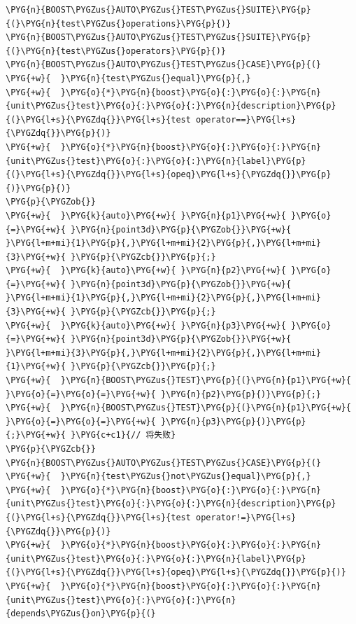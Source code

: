 \begin{itemize}
\begin{codeblockbg}
\begin{Verbatim}[commandchars=\\\{\},breaklines=true,breakanywhere=true,fontsize=\codefont,xleftmargin=17bp]
\PYG{n}{BOOST\PYGZus{}AUTO\PYGZus{}TEST\PYGZus{}SUITE}\PYG{p}{(}\PYG{n}{test\PYGZus{}operations}\PYG{p}{)}
\PYG{n}{BOOST\PYGZus{}AUTO\PYGZus{}TEST\PYGZus{}SUITE}\PYG{p}{(}\PYG{n}{test\PYGZus{}operators}\PYG{p}{)}
\PYG{n}{BOOST\PYGZus{}AUTO\PYGZus{}TEST\PYGZus{}CASE}\PYG{p}{(}
\PYG{+w}{  }\PYG{n}{test\PYGZus{}equal}\PYG{p}{,}
\PYG{+w}{  }\PYG{o}{*}\PYG{n}{boost}\PYG{o}{:}\PYG{o}{:}\PYG{n}{unit\PYGZus{}test}\PYG{o}{:}\PYG{o}{:}\PYG{n}{description}\PYG{p}{(}\PYG{l+s}{\PYGZdq{}}\PYG{l+s}{test operator==}\PYG{l+s}{\PYGZdq{}}\PYG{p}{)}
\PYG{+w}{  }\PYG{o}{*}\PYG{n}{boost}\PYG{o}{:}\PYG{o}{:}\PYG{n}{unit\PYGZus{}test}\PYG{o}{:}\PYG{o}{:}\PYG{n}{label}\PYG{p}{(}\PYG{l+s}{\PYGZdq{}}\PYG{l+s}{opeq}\PYG{l+s}{\PYGZdq{}}\PYG{p}{)}\PYG{p}{)}
\PYG{p}{\PYGZob{}}
\PYG{+w}{  }\PYG{k}{auto}\PYG{+w}{ }\PYG{n}{p1}\PYG{+w}{ }\PYG{o}{=}\PYG{+w}{ }\PYG{n}{point3d}\PYG{p}{\PYGZob{}}\PYG{+w}{ }\PYG{l+m+mi}{1}\PYG{p}{,}\PYG{l+m+mi}{2}\PYG{p}{,}\PYG{l+m+mi}{3}\PYG{+w}{ }\PYG{p}{\PYGZcb{}}\PYG{p}{;}
\PYG{+w}{  }\PYG{k}{auto}\PYG{+w}{ }\PYG{n}{p2}\PYG{+w}{ }\PYG{o}{=}\PYG{+w}{ }\PYG{n}{point3d}\PYG{p}{\PYGZob{}}\PYG{+w}{ }\PYG{l+m+mi}{1}\PYG{p}{,}\PYG{l+m+mi}{2}\PYG{p}{,}\PYG{l+m+mi}{3}\PYG{+w}{ }\PYG{p}{\PYGZcb{}}\PYG{p}{;}
\PYG{+w}{  }\PYG{k}{auto}\PYG{+w}{ }\PYG{n}{p3}\PYG{+w}{ }\PYG{o}{=}\PYG{+w}{ }\PYG{n}{point3d}\PYG{p}{\PYGZob{}}\PYG{+w}{ }\PYG{l+m+mi}{3}\PYG{p}{,}\PYG{l+m+mi}{2}\PYG{p}{,}\PYG{l+m+mi}{1}\PYG{+w}{ }\PYG{p}{\PYGZcb{}}\PYG{p}{;}
\PYG{+w}{  }\PYG{n}{BOOST\PYGZus{}TEST}\PYG{p}{(}\PYG{n}{p1}\PYG{+w}{ }\PYG{o}{=}\PYG{o}{=}\PYG{+w}{ }\PYG{n}{p2}\PYG{p}{)}\PYG{p}{;}
\PYG{+w}{  }\PYG{n}{BOOST\PYGZus{}TEST}\PYG{p}{(}\PYG{n}{p1}\PYG{+w}{ }\PYG{o}{=}\PYG{o}{=}\PYG{+w}{ }\PYG{n}{p3}\PYG{p}{)}\PYG{p}{;}\PYG{+w}{ }\PYG{c+c1}{// 将失败}
\PYG{p}{\PYGZcb{}}
\PYG{n}{BOOST\PYGZus{}AUTO\PYGZus{}TEST\PYGZus{}CASE}\PYG{p}{(}
\PYG{+w}{  }\PYG{n}{test\PYGZus{}not\PYGZus{}equal}\PYG{p}{,}
\PYG{+w}{  }\PYG{o}{*}\PYG{n}{boost}\PYG{o}{:}\PYG{o}{:}\PYG{n}{unit\PYGZus{}test}\PYG{o}{:}\PYG{o}{:}\PYG{n}{description}\PYG{p}{(}\PYG{l+s}{\PYGZdq{}}\PYG{l+s}{test operator!=}\PYG{l+s}{\PYGZdq{}}\PYG{p}{)}
\PYG{+w}{  }\PYG{o}{*}\PYG{n}{boost}\PYG{o}{:}\PYG{o}{:}\PYG{n}{unit\PYGZus{}test}\PYG{o}{:}\PYG{o}{:}\PYG{n}{label}\PYG{p}{(}\PYG{l+s}{\PYGZdq{}}\PYG{l+s}{opeq}\PYG{l+s}{\PYGZdq{}}\PYG{p}{)}
\PYG{+w}{  }\PYG{o}{*}\PYG{n}{boost}\PYG{o}{:}\PYG{o}{:}\PYG{n}{unit\PYGZus{}test}\PYG{o}{:}\PYG{o}{:}\PYG{n}{depends\PYGZus{}on}\PYG{p}{(}

\end{Verbatim}
\end{codeblockbg}
\end{itemize}
